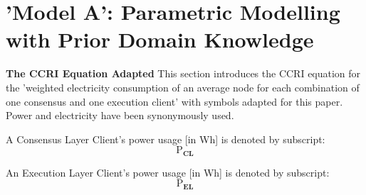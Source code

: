     

\section{'Model A': Parametric Modelling with Prior Domain Knowledge}



\textbf{The CCRI Equation Adapted}
This section introduces the CCRI equation for the 'weighted  electricity  consumption  of  an  average  node for each combination of one consensus and one execution client'\cite{CryptoCarbonRatingsInstitute2022TheNetwork} with symbols adapted for this paper. Power and electricity have been synonymously used. 

A Consensus Layer Client's power usage [in Wh] is denoted by subscript:
\begin{equation*}
    \boldsymbol{\mathrm{P}_{CL}}
\end{equation*}

An Execution Layer Client's power usage [in Wh] is denoted by subscript:
\begin{equation*}
    \boldsymbol{\mathrm{P}_{EL}}
\end{equation*}
 
